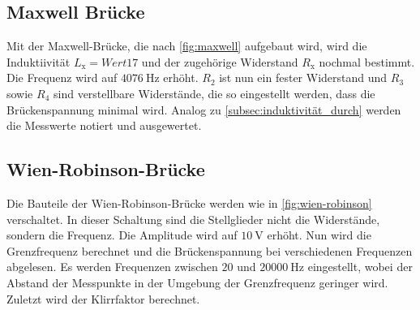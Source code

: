 \subsection{Maxwell Brücke}
\label{subsec:maxwell_durch}
Mit der Maxwell-Brücke, die nach \autoref{fig:maxwell} aufgebaut wird, wird die Induktiivität $L_{\text{x}}=Wert 17$ und der zugehörige Widerstand $R_{\text{x}}$ nochmal bestimmt.
Die Frequenz wird auf $\qty{4076}{\hertz}$ erhöht. 
$R_2$ ist nun ein fester Widerstand und $R_3$ sowie $R_4$ sind verstellbare Widerstände, die so eingestellt werden, dass die Brückenspannung minimal wird.
Analog zu \autoref{subsec:induktivität_durch} werden die Messwerte notiert und ausgewertet.

\subsection{Wien-Robinson-Brücke}
\label{subsec:wien-robinson_durch}
Die Bauteile der Wien-Robinson-Brücke werden wie in \autoref{fig:wien-robinson} verschaltet.
In dieser Schaltung sind die Stellglieder nicht die Widerstände, sondern die Frequenz.
Die Amplitude wird auf $\qty{10}{\volt}$ erhöht.
Nun wird die Grenzfrequenz berechnet und die Brückenspannung bei verschiedenen Frequenzen abgelesen.
Es werden Frequenzen zwischen $20$ und $\qty{20000}{\hertz}$ eingestellt, wobei der Abstand der Messpunkte in der Umgebung der Grenzfrequenz geringer wird.
Zuletzt wird der Klirrfaktor berechnet.